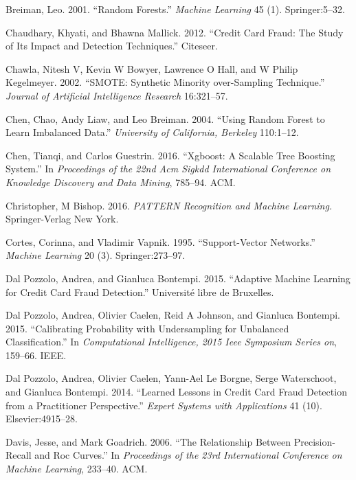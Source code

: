 \documentclass[12pt,]{article}
\begin{document}
\leavevmode\hypertarget{ref-breiman2001random}{}%
Breiman, Leo. 2001. ``Random Forests.'' \emph{Machine Learning} 45 (1).
Springer:5--32.

\leavevmode\hypertarget{ref-chaudhary2012credit}{}%
Chaudhary, Khyati, and Bhawna Mallick. 2012. ``Credit Card Fraud: The
Study of Its Impact and Detection Techniques.'' Citeseer.

\leavevmode\hypertarget{ref-chawla2002smote}{}%
Chawla, Nitesh V, Kevin W Bowyer, Lawrence O Hall, and W Philip
Kegelmeyer. 2002. ``SMOTE: Synthetic Minority over-Sampling Technique.''
\emph{Journal of Artificial Intelligence Research} 16:321--57.

\leavevmode\hypertarget{ref-chen2004using}{}%
Chen, Chao, Andy Liaw, and Leo Breiman. 2004. ``Using Random Forest to
Learn Imbalanced Data.'' \emph{University of California, Berkeley}
110:1--12.

\leavevmode\hypertarget{ref-chen2016xgboost}{}%
Chen, Tianqi, and Carlos Guestrin. 2016. ``Xgboost: A Scalable Tree
Boosting System.'' In \emph{Proceedings of the 22nd Acm Sigkdd
International Conference on Knowledge Discovery and Data Mining},
785--94. ACM.

\leavevmode\hypertarget{ref-christopher2016pattern}{}%
Christopher, M Bishop. 2016. \emph{PATTERN Recognition and Machine
Learning.} Springer-Verlag New York.

\leavevmode\hypertarget{ref-cortes1995support}{}%
Cortes, Corinna, and Vladimir Vapnik. 1995. ``Support-Vector Networks.''
\emph{Machine Learning} 20 (3). Springer:273--97.

\leavevmode\hypertarget{ref-dal2015adaptive}{}%
Dal Pozzolo, Andrea, and Gianluca Bontempi. 2015. ``Adaptive Machine
Learning for Credit Card Fraud Detection.'' Université libre de
Bruxelles.

\leavevmode\hypertarget{ref-dal2015calibrating}{}%
Dal Pozzolo, Andrea, Olivier Caelen, Reid A Johnson, and Gianluca
Bontempi. 2015. ``Calibrating Probability with Undersampling for
Unbalanced Classification.'' In \emph{Computational Intelligence, 2015
Ieee Symposium Series on}, 159--66. IEEE.

\leavevmode\hypertarget{ref-dal2014learned}{}%
Dal Pozzolo, Andrea, Olivier Caelen, Yann-Ael Le Borgne, Serge
Waterschoot, and Gianluca Bontempi. 2014. ``Learned Lessons in Credit
Card Fraud Detection from a Practitioner Perspective.'' \emph{Expert
Systems with Applications} 41 (10). Elsevier:4915--28.

\leavevmode\hypertarget{ref-davis2006relationship}{}%
Davis, Jesse, and Mark Goadrich. 2006. ``The Relationship Between
Precision-Recall and Roc Curves.'' In \emph{Proceedings of the 23rd
International Conference on Machine Learning}, 233--40. ACM.
\end{document}
